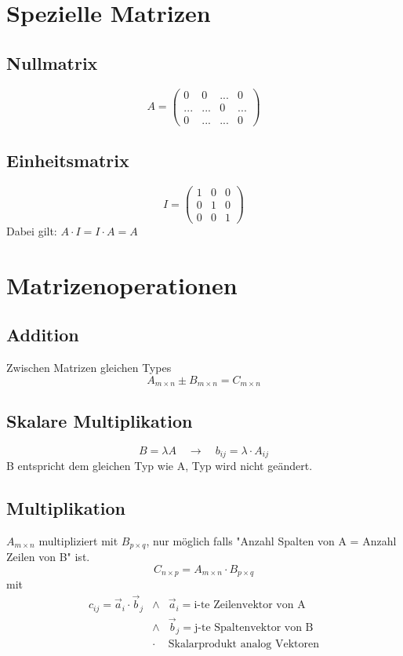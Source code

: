 \documentclass{report}
\begin{document}
\section{Spezielle Matrizen}
\subsection{Nullmatrix}
\begin{equation}A = \left(\begin{matrix}0 & 0 & ... & 0\\... & ... & 0 & ...\\0 & ... & ... & 0\end{matrix}\right)\end{equation}
\subsection{Einheitsmatrix}
\begin{equation}I = \left(\begin{matrix}1 & 0 & 0\\0 & 1 & 0\\0 & 0 & 1\end{matrix}\right)\end{equation}
Dabei gilt: $A \cdot I = I \cdot A = A$
\section{Matrizenoperationen}
\subsection{Addition}
Zwischen Matrizen gleichen Types
\begin{equation}A_{m \times n} \pm B_{m \times n} = C_{m \times n}\end{equation}
\subsection{Skalare Multiplikation}
\begin{equation}B = \lambda A \quad \to \quad b_{ij} = \lambda \cdot A_{ij}\end{equation}
B entspricht dem gleichen Typ wie A, Typ wird nicht geändert.
\subsection{Multiplikation}
$A_{m \times n}$ multipliziert mit $B_{p \times q}$, nur möglich falls "Anzahl Spalten von A = Anzahl Zeilen von B" ist.
\begin{equation}C_{n \times p} = A_{m \times n} \cdot B_{p \times q}\end{equation}
mit
\begin{eqnarray}c_{ij} = \vec{a}_i \cdot \vec{b}_j & \land & \vec{a}_i = \mbox{i-te Zeilenvektor von A}\\
& \land & \vec{b}_j = \mbox{j-te Spaltenvektor von B}\\
& \cdot & \mbox{Skalarprodukt analog Vektoren}\end{eqnarray}
\end{document}
